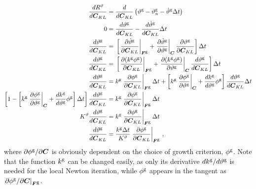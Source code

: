 \documentclass[10pt,letterpaper,oneside]{report}
\newcommand{\ten}[1]{\mbox{\boldmath $#1$}{}}
\newcommand{\scas}[1]{\mbox{{\scriptsize{${\rm{#1}}$}}}{}}
\newcommand{\tens}[1]{\mbox{\boldmath{\scriptsize{$#1$}}}{}}
\begin{document}
\begin{align}
\frac{d R^\vartheta}{d \ten{C}_{KL} } 
={}& \frac{d }{d \ten{C}_{KL} } \left( \vartheta^{\scas{g}} - \vartheta^{\scas{g}}_n - \dot{\vartheta}^{\scas{g}} \Delta t \right) 
\notag \\
0 
={}& \frac{d \vartheta^{\scas{g}} }{d \ten{C}_{KL} } - \frac{d \dot{\vartheta}^{\scas{g}} }{d \ten{C}_{KL} } \Delta t 
\notag \\
\frac{d \vartheta^{\scas{g}} }{d \ten{C}_{KL} } 
={}& \left[ \left. \frac{\partial \dot{\vartheta}^{\scas{g}} }{\partial \ten{C}_{KL} } \right|_{\tens{F}^{\scas{g}}} + \left. \frac{\partial \dot{\vartheta}^{\scas{g}} }{\partial \vartheta^{\scas{g}}} \right|_{\tens{C}} \frac{\partial \vartheta^{\scas{g}} }{\partial \ten{C}_{KL} } \right] \Delta t 
\notag \\
\frac{d \vartheta^{\scas{g}} }{d \ten{C}_{KL} } 
={}& \left[ \left. \frac{ \partial ( k^{\scas{g}} \phi^{\scas{g}} ) }{\partial \ten{C}_{KL} } \right|_{\tens{F}^{\scas{g}}} + \left. \frac{ \partial ( k^{\scas{g}} \phi^{\scas{g}} ) }{\partial \vartheta^{\scas{g}}} \right|_{\tens{C}} \frac{d \vartheta^{\scas{g}} }{d \ten{C}_{KL} } \right] \Delta t
\notag \\
\frac{d \vartheta^{\scas{g}} }{d \ten{C}_{KL} } 
={}& k^{\scas{g}} \left. \frac{ \partial \phi^{\scas{g}} }{\partial \ten{C}_{KL} } \right|_{\tens{F}^{\scas{g}}} \Delta t + \left[ k^{\scas{g}} \left. \frac{ \partial \phi^{\scas{g}} }{\partial \vartheta^{\scas{g}}} \right|_{\tens{C}} + \frac{ d k^{\scas{g}} }{d \vartheta^{\scas{g}}} \phi^{\scas{g}} \right] \frac{d \vartheta^{\scas{g}} }{d \ten{C}_{KL} } \Delta t
\notag \\
\left[ 1 - \left[ k^{\scas{g}} \left. \frac{\partial \phi^{\scas{g}} }{\partial \vartheta^{\scas{g}}} \right|_{\tens{C}} + \frac{d k^{\scas{g}} }{d \vartheta^{\scas{g}}} \phi^{\scas{g}} \right] \Delta t \right] \frac{d \vartheta^{\scas{g}} }{d \ten{C}_{KL} }  
={}& k^{\scas{g}} \left. \frac{\partial \phi^{\scas{g}} }{\partial \ten{C}_{KL} } \right|_{\tens{F}^{\scas{g}}} \Delta t 
\notag \\
K^\vartheta \frac{d \vartheta^{\scas{g}} }{d \ten{C}_{KL} } 
={}& k^{\scas{g}} \left. \frac{\partial \phi^{\scas{g}} }{\partial \ten{C}_{KL}} \right|_{\tens{F}^{\scas{g}}} \Delta t 
\notag \\
\frac{d \vartheta^{\scas{g}} }{d \ten{C}_{KL} } 
={}& \frac{k^{\scas{g}} \Delta t}{K^\vartheta} \left. \frac{\partial \phi^{\scas{g}} }{\partial \ten{C}_{KL} } \right|_{\tens{F}^{\scas{g}}} \, , 
\end{align}
where $\partial \phi^{\scas{g}} / \partial \ten{C}$ is obviously dependent on the choice of growth criterion, $\phi^{\scas{g}}$.  Note that the function $k^{\scas{g}}$ can be changed easily, as only its derivative $ d k^{\scas{g}} / d \vartheta^{\scas{g}}$ is needed for the local Newton iteration, while $\phi^{\scas{g}}$ appears in the tangent as $\left. \partial \phi^{\scas{g}} / \partial \ten{C}\right|_{\tens{F}^{\scas{g}}}$.
\end{document}

